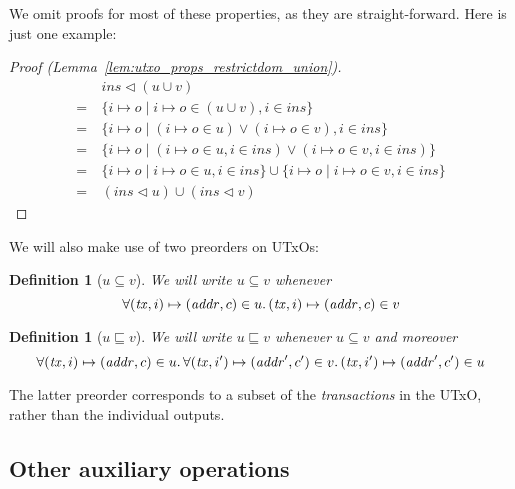 \documentclass{article}
\newcommand{\restrictdom}{\lhd}
\newtheorem{definition}[lemma]{Definition}
\numberwithin{equation}{lemma}
\begin{document}
We omit proofs for most of these properties, as they are straight-forward.
Here is just one example:
%
\begin{proof}[Proof (Lemma~\ref{lem:utxo_props_restrictdom_union})]
\begin{align*}
  & ~ \mathit{ins} \restrictdom (u \cup v) \\
= & ~ \{ i \mapsto o \mid i \mapsto o \in (u \cup v), i \in \mathit{ins} \} \\
= & ~ \{ i \mapsto o \mid (i \mapsto o \in u) \vee (i \mapsto o \in v), i \in \mathit{ins} \} \\
= & ~ \{ i \mapsto o \mid (i \mapsto o \in u, i \in \mathit{ins}) \vee (i \mapsto o \in v, i \in \mathit{ins}) \} \\
= & ~ \{ i \mapsto o \mid i \mapsto o \in u, i \in \mathit{ins} \} \cup \{ i \mapsto o \mid i \mapsto o \in v, i \in \mathit{ins} \} \\
= & ~ (\mathit{ins} \restrictdom u) \cup (\mathit{ins} \restrictdom v)
\end{align*}
\end{proof}

We will also make use of two preorders on UTxOs:

\begin{definition}[$u \subseteq v$]
We will write $u \subseteq v$ whenever
\begin{equation*}
\forall (\mathit{tx}, i)  \mapsto (\mathit{addr}, c) \in u \ldotp
(\mathit{tx}, i)  \mapsto (\mathit{addr}, c) \in v
\end{equation*}
\end{definition}

\begin{definition}[$u \sqsubseteq v$]
We will write $u \sqsubseteq v$ whenever $u \subseteq v$ and moreover
\begin{equation*}
\forall (\mathit{tx}, i)  \mapsto (\mathit{addr}, c) \in u \ldotp
\forall (\mathit{tx}, i') \mapsto (\mathit{addr}', c') \in v \ldotp
(\mathit{tx}, i') \mapsto (\mathit{addr}', c') \in u
\end{equation*}
\end{definition}

The latter preorder corresponds to a subset of the \emph{transactions}
in the UTxO, rather than the individual outputs.

\subsection{Other auxiliary operations}
\end{document}
